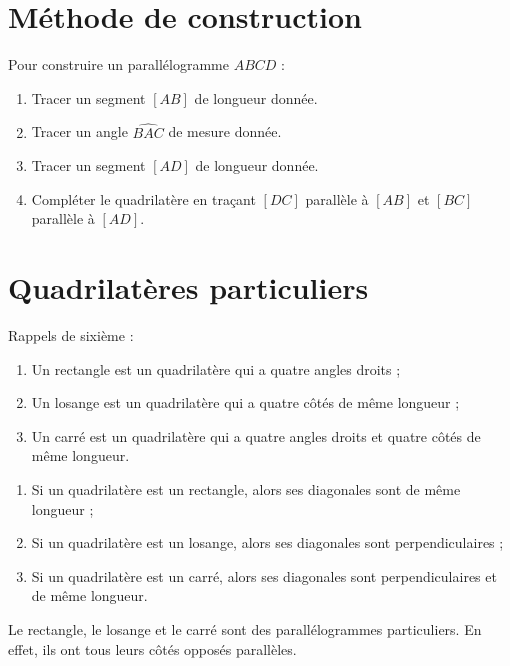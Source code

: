 \documentclass[11pt]{article}
\begin{document}
\section{Méthode de construction}

\begin{exemple}
Pour construire un parallélogramme $ABCD$ :
\begin{enumerate}
\item Tracer un segment $[AB]$ de longueur donnée.
\item Tracer un angle $\widehat{BAC}$ de mesure donnée.
\item Tracer un segment $[AD]$ de longueur donnée.
\item Compléter le quadrilatère en traçant $[DC]$ parallèle à $[AB]$ et $[BC]$ parallèle à $[AD]$.
\end{enumerate}
\end{exemple}

\begin{center}
\end{center}

\section{Quadrilatères particuliers}

\begin{definition}
Rappels de sixième :
\begin{enumerate}
\item Un rectangle est un quadrilatère qui a quatre angles droits ;
\item Un losange est un quadrilatère qui a quatre côtés de même
longueur ;
\item Un carré est un quadrilatère qui a quatre angles droits et
quatre côtés de même longueur.
\end{enumerate}
\end{definition}

\begin{propriete}
\begin{enumerate}
\item Si un quadrilatère est un rectangle, alors ses diagonales sont
de même longueur ; 
\item Si un quadrilatère est un losange, alors ses diagonales sont
perpendiculaires ; 
\item Si un quadrilatère est un carré, alors ses diagonales sont perpendiculaires et de même longueur.
\end{enumerate}
\end{propriete}

\begin{remarque}
Le rectangle, le losange et le carré sont des parallélogrammes particuliers. En effet, ils ont tous leurs côtés opposés parallèles.
\end{remarque}
\end{document}
